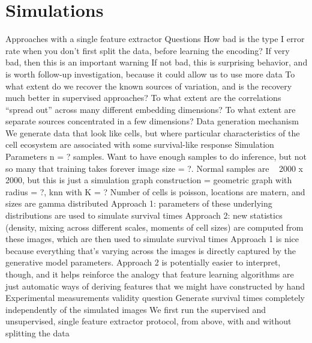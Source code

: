\documentclass[11pt]{article}
\begin{document}
\section{Simulations}

\begin{outline}
  \1 Approaches with a single feature extractor
    \2 Questions
      \3 How bad is the type I error rate when you don't first split the data,
      before learning the encoding?
        \4 If very bad, then this is an important warning
        \4 If not bad, this is surprising behavior, and is worth follow-up
        investigation, because it could allow us to use more data
      \3 To what extent do we recover the known sources of variation, and is the
      recovery much better in supervised approaches?
        \4 To what extent are the correlations ``spread out'' across many
        different embedding dimensions? To what extent are separate sources
        concentrated in a few dimensions?
    \2 Data generation mechanism
      \3 We generate data that look like cells, but where particular
      characteristics of the cell ecosystem are associated with some
      survival-like response
      \3 Simulation Parameters
        \4 n = ? samples. Want to have enough samples to do inference, but not
        so many that training takes forever
        \4 image size = ?. Normal samples are ~ 2000 x 2000, but this is just a
        simulation
        \4 graph construction = geometric graph with radius = ?, knn with K = ?
      \3 Number of cells is poisson, locations are matern, and sizes are gamma
      distributed
        \4 Approach 1: parameters of these underlying distributions are used to
        simulate survival times
        \4 Approach 2: new statistics (density, mixing across different scales,
        moments of cell sizes) are computed from these images, which are then
        used to simulate survival times
        \4 Approach 1 is nice because everything that's varying across the
        images is directly captured by the generative model parameters. Approach
        2 is potentially easier to interpret, though, and it helps reinforce the
        analogy that feature learning algorithms are just automatic ways of
        deriving features that we might have constructed by hand
    \2 Experimental measurements
      \3 validity question
        \4 Generate survival times completely independently of the simulated
        images
        \4 We first run the supervised and unsupervised, single feature extractor
        protocol, from above, with and without splitting the data

\end{outline}
\end{document}

